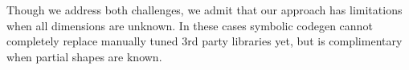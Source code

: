 Though we address both challenges, we admit that our approach has limitations when all dimensions are unknown.
In these cases symbolic codegen cannot completely replace manually tuned 3rd party libraries yet,
  but is complimentary when partial shapes are known.





